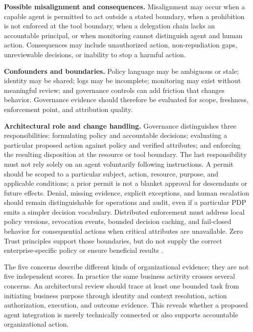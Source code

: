 \documentclass[11pt,letterpaper]{article}
\newcommand{\parencite}[1]{\citep{#1}}
\begin{document}
\textbf{Possible misalignment and consequences.} Misalignment may occur when a capable agent is permitted to act outside a stated boundary, when a prohibition is not enforced at the tool boundary, when a delegation chain lacks an accountable principal, or when monitoring cannot distinguish agent and human action. Consequences may include unauthorized action, non-repudiation gaps, unreviewable decisions, or inability to stop a harmful action.

\textbf{Confounders and boundaries.} Policy language may be ambiguous or stale; identity may be shared; logs may be incomplete; monitoring may exist without meaningful review; and governance controls can add friction that changes behavior. Governance evidence should therefore be evaluated for scope, freshness, enforcement point, and attribution quality.

\textbf{Architectural role and change handling.} Governance distinguishes three responsibilities: formulating policy and accountable decisions; evaluating a particular proposed action against policy and verified attributes; and enforcing the resulting disposition at the resource or tool boundary. The last responsibility must not rely solely on an agent voluntarily following instructions. A permit should be scoped to a particular subject, action, resource, purpose, and applicable conditions; a prior permit is not a blanket approval for descendants or future effects. Denial, missing evidence, explicit exceptions, and human escalation should remain distinguishable for operations and audit, even if a particular PDP emits a simpler decision vocabulary. Distributed enforcement must address local policy versions, revocation events, bounded decision caching, and fail-closed behavior for consequential actions when critical attributes are unavailable. Zero Trust principles support those boundaries, but do not supply the correct enterprise-specific policy or ensure beneficial results \parencite{nist207a2023,opa2026agent}.

The five concerns describe different kinds of organizational evidence; they are not five independent scores. In practice the same business activity crosses several concerns. An architectural review should trace at least one bounded task from initiating business purpose through identity and context resolution, action authorization, execution, and outcome evidence. This reveals whether a proposed agent integration is merely technically connected or also supports accountable organizational action.
\end{document}

